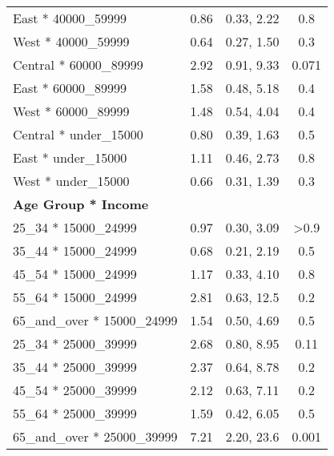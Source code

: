 \documentclass[
  letterpaper,
  DIV=11,
  numbers=noendperiod]{scrartcl}
\begin{document}
\begin{longtable}{lccc}
\hspace{1em}East * 40000\_59999 & 0.86 & 0.33, 2.22 & 0.8\\
\hspace{1em}West * 40000\_59999 & 0.64 & 0.27, 1.50 & 0.3\\
\hspace{1em}Central * 60000\_89999 & 2.92 & 0.91, 9.33 & 0.071\\
\addlinespace
\hspace{1em}East * 60000\_89999 & 1.58 & 0.48, 5.18 & 0.4\\
\hspace{1em}West * 60000\_89999 & 1.48 & 0.54, 4.04 & 0.4\\
\hspace{1em}Central * under\_15000 & 0.80 & 0.39, 1.63 & 0.5\\
\hspace{1em}East * under\_15000 & 1.11 & 0.46, 2.73 & 0.8\\
\hspace{1em}West * under\_15000 & 0.66 & 0.31, 1.39 & 0.3\\
\addlinespace
\textbf{Age Group * Income} &  &  & \\
\hspace{1em}25\_34 * 15000\_24999 & 0.97 & 0.30, 3.09 & >0.9\\
\hspace{1em}35\_44 * 15000\_24999 & 0.68 & 0.21, 2.19 & 0.5\\
\hspace{1em}45\_54 * 15000\_24999 & 1.17 & 0.33, 4.10 & 0.8\\
\hspace{1em}55\_64 * 15000\_24999 & 2.81 & 0.63, 12.5 & 0.2\\
\addlinespace
\hspace{1em}65\_and\_over * 15000\_24999 & 1.54 & 0.50, 4.69 & 0.5\\
\hspace{1em}25\_34 * 25000\_39999 & 2.68 & 0.80, 8.95 & 0.11\\
\hspace{1em}35\_44 * 25000\_39999 & 2.37 & 0.64, 8.78 & 0.2\\
\hspace{1em}45\_54 * 25000\_39999 & 2.12 & 0.63, 7.11 & 0.2\\
\hspace{1em}55\_64 * 25000\_39999 & 1.59 & 0.42, 6.05 & 0.5\\
\addlinespace
\hspace{1em}65\_and\_over * 25000\_39999 & 7.21 & 2.20, 23.6 & 0.001\\

\end{longtable}
\end{document}
